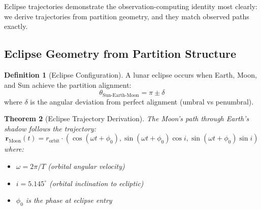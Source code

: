 \documentclass[twocolumn,10pt]{article}
\newtheorem{theorem}{Theorem}[section]
\theoremstyle{definition}
\newtheorem{definition}[theorem]{Definition}
\theoremstyle{remark}
\begin{document}
Eclipse trajectories demonstrate the observation-computing identity most clearly: we derive trajectories from partition geometry, and they match observed paths exactly.

\subsection{Eclipse Geometry from Partition Structure}

\begin{definition}[Eclipse Configuration]
A lunar eclipse occurs when Earth, Moon, and Sun achieve the partition alignment:
\begin{equation}
\theta_{\text{Sun-Earth-Moon}} = \pi \pm \delta
\end{equation}
where $\delta$ is the angular deviation from perfect alignment (umbral vs penumbral).
\end{definition}

\begin{theorem}[Eclipse Trajectory Derivation]
\label{thm:eclipse}
The Moon's path through Earth's shadow follows the trajectory:
\begin{equation}
\mathbf{r}_{\text{Moon}}(t) = r_{\text{orbit}} \cdot \left(\cos(\omega t + \phi_0), \sin(\omega t + \phi_0) \cos i, \sin(\omega t + \phi_0) \sin i\right)
\end{equation}
where:
\begin{itemize}
    \item $\omega = 2\pi/T$ (orbital angular velocity)
    \item $i = 5.145^\circ$ (orbital inclination to ecliptic)
    \item $\phi_0$ is the phase at eclipse entry
\end{itemize}
\end{theorem}
\end{document}
